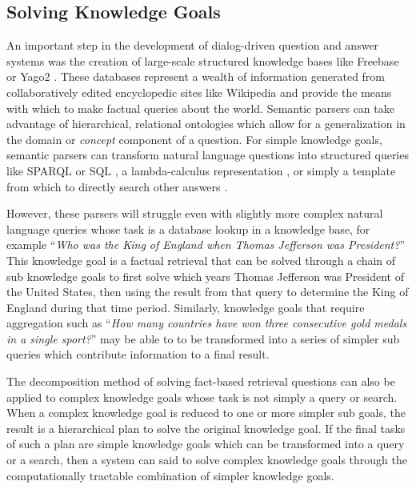 \documentclass[11pt,letterpaper]{article}
\begin{document}
\subsection{Solving Knowledge Goals}


An important step in the development of dialog-driven question and answer systems was the creation of large-scale structured knowledge bases like Freebase \cite{bollacker_freebase:_2008} or Yago2 \cite{suchanek_yago:_2007}. These databases represent a wealth of information generated from collaboratively edited encyclopedic sites like Wikipedia and provide the means with which to make factual queries about the world. Semantic parsers can take advantage of hierarchical, relational ontologies which allow for a generalization in the domain or \textit{concept} component of a question. For simple knowledge goals, semantic parsers can transform natural language questions into structured queries like SPARQL or SQL \cite{yahya_natural_2012}, a lambda-calculus representation \cite{berant_semantic_2013}, or simply a template from which to directly search other answers \cite{unger_template-based_2012}.

However, these parsers will struggle even with slightly more complex natural language queries whose task is a database lookup in a knowledge base, for example ``\textit{Who was the King of England when Thomas Jefferson was President?}'' This knowledge goal is a factual retrieval that can be solved through a chain of sub knowledge goals to first solve which years Thomas Jefferson was President of the United States, then using the result from that query to determine the King of England during that time period. Similarly, knowledge goals that require aggregation such as ``\textit{How many countries have won three consecutive gold medals in a single sport?}'' may be able to to be transformed into a series of simpler sub queries which contribute information to a final result.

The decomposition method of solving fact-based retrieval questions can also be applied to complex knowledge goals whose task is not simply a query or search. When a complex knowledge goal is reduced to one or more simpler sub goals, the result is a hierarchical plan to solve the original knowledge goal. If the final tasks of such a plan are simple knowledge goals which can be transformed into a query or a search, then a system can said to solve complex knowledge goals through the computationally tractable combination of simpler knowledge goals.
\end{document}
